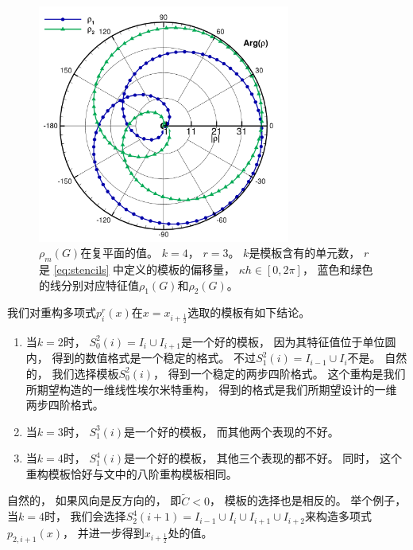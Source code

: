 \begin{figure}[htbp]
  \centering
  \includegraphics[width=0.74\textwidth]{fig/1D/pol83.pdf}
  \caption{$\rho_m(G)$在复平面的值。
    $k=4$，
    $r=3$。
    $k$是模板含有的单元数，
    $r$是 \cref{eq:stencils} 中定义的模板的偏移量，
    $\kappa h\in [0,2\pi]$，
    蓝色和绿色的线分别对应特征值$\rho_1(G)$和$\rho_2(G)$。
  }
  \label{fig:eigens-5}
\end{figure}

我们对重构多项式$p^r_i(x)$在$x=x_{i+\frac 12}$选取的模板有如下结论。

\begin{enumerate}
  \item 当$k=2$时，
        $S^2_0(i)= I_{i}\cup I_{i+1}$是一个好的模板，
        因为其特征值位于单位圆内，
        得到的数值格式是一个稳定的格式。
        不过$S^2_1(i)= I_{i-1}\cup I_{i}$不是。
        自然的，
        我们选择模板$S^2_0(i)$，
        得到一个稳定的两步四阶格式。
        这个重构是我们所期望构造的一维线性埃尔米特重构，
        得到的格式是我们所期望设计的一维两步四阶格式。
  \item 当$k=3$时，
        $S^3_1(i)$是一个好的模板，
        而其他两个表现的不好。
  \item 当$k=4$时，
        $S^4_1(i)$是一个好的模板，
        其他三个表现的都不好。
        同时，
        这个重构模板恰好与文\cite{zhao2019compact}中的八阶重构模板相同。
\end{enumerate}

自然的，
如果风向是反方向的，
即$\widetilde{C}<0$，
模板的选择也是相反的。
举个例子，
当$k=4$时，
我们会选择$S^4_2(i+1)=I_{i-1}\cup I_{i}\cup I_{i+1}\cup I_{i+2}$来构造多项式$p_{2,i+1}(x)$，
并进一步得到$x_{i+\frac 12}$处的值。

